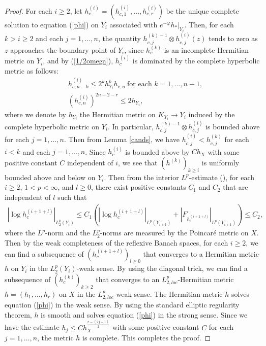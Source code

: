 \documentclass[12pt]{article}
\theoremstyle{definition}
\def\refe{\ast}
\begin{document}
\begin{proof} 
For each $i\geq 2$, let $h_c^{(i)}=(h_{c,1}^{(i)},\dots, h_{c,r}^{(i)})$ be the unique complete solution to equation (\ref{phi}) on $Y_i$ associated with $e^{-\varphi}h_\refe|_{Y_i}$. Then, for each $k > i \geq 2$ and each $j = 1, \dots, n$, the quantity $h_{c,j}^{(k)-1} \otimes h_{c,j}^{(i)}(z)$ tends to zero as $z$ approaches the boundary point of $Y_i$, since $h_c^{(k)}$ is an incomplete Hermitian metric on $Y_i $, and by (\ref{1/2omega}), $h_c^{(i)}$ is dominated by the complete hyperbolic metric as follows:
\begin{align*}
&h^{(i)}_{c, n-k}\leq 2^kh_{Y_i}^kh_{c,n} \ \text{for each $k=1,\dots, n-1$}, \\
&(h_{c,n}^{(i)})^{2n+2-r}\leq 2h_{Y_i},
\end{align*} 
where we denote by $h_{Y_i}$ the Hermitian metric on $K_{Y_i}\rightarrow Y_i$ induced by the complete hyperbolic metric on $Y_i$. In particular, $h_{c,j}^{(k)-1} \otimes h_{c,j}^{(i)}$ is bounded above for each $j=1,\dots, n$. Then from Lemma \ref{cands}, we have $h_{c,j}^{(i)}<h_{c,j}^{(k)}$ for each $i<k$ and each $j=1,\dots, n$. Since $h_{c}^{(i)}$ is bounded above by $Ch_X$ with some positive constant $C$ independent of $i$, we see that $(h^{(k)})_{k\geq i}$ is uniformly bounded above and below on $Y_i$. Then from the interior $L^p$-estimate (\cite[Theorem 9.11]{GT1}), for each $i\geq 2$, $1<p<\infty$, and $l\geq 0$, there exist positive constants $C_1$ and $C_2$ that are independent of $l$ such that
\begin{align*}
|\log h_c^{(i+1+l)}|_{L^p_2(Y_i)}\leq C_1(|\log h_c^{(i+1+l)}|_{L^p(Y_{i+1})}+|F_{h_c^{(i+1+l)}}|_{L^p(Y_{i+1})})\leq C_2,
\end{align*}
where the $L^p$-norm and the $L^p_2$-norms are measured by the Poincar\'e metric on $X$. Then by the weak completeness of the reflexive Banach spaces, for each $i\geq 2$, we can find a subsequence of $(h_c^{(i+1+l)})_{l\geq 0}$ that converges to a Hermitian metric $h$ on $Y_i$ in the $L^p_2(Y_i)$-weak sense. By using the diagonal trick, we can find a subsequence of $(h_c^{(k)})_{k\geq 2}$ that converges to an $L^p_{2,loc}$-Hermitian metric $h=(h_1,\dots, h_r)$ on $X$ in the $L^p_{2,loc}$-weak sense. The Hermitian metric $h$ solves equation (\ref{phi}) in the weak sense. By using the standard elliptic regularity theorem, $h$ is smooth and solves equation (\ref{phi}) in the strong sense. Since we have the estimate $h_j\leq Ch_X^{\frac{r-(2j-1)}{2}}$ with some positive constant $C$ for each $j=1,\dots, n$, the metric $h$ is complete. This completes the proof. 
\end{proof}
\end{document}
